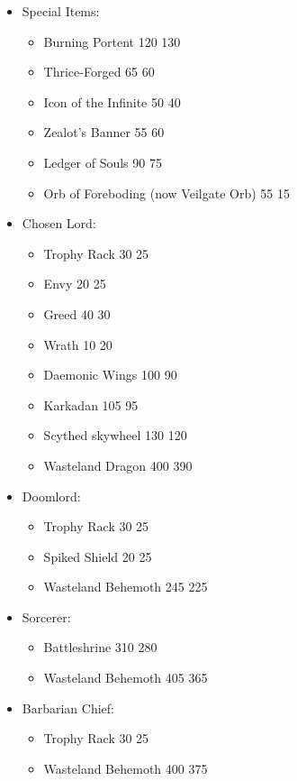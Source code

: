 \subtitle{Balance update}

\begin{itemize}
\item Special Items:
\begin{itemize}
\item Burning Portent 120 \costup{} 130
\item Thrice-Forged 65 \costdown{} 60
\item Icon of the Infinite 50 \costdown{} 40
\item Zealot's Banner 55 \costup{} 60
\item Ledger of Souls 90 \costdown{} 75
\item Orb of Foreboding (now Veilgate Orb) 55 \costdown{} 15
\end{itemize}
\item Chosen Lord:
\begin{itemize} 
\item Trophy Rack 30 \costdown{} 25
\item Envy 20 \costup{} 25
\item Greed 40 \costdown{} 30
\item Wrath 10 \costup{} 20
\item Daemonic Wings 100 \costdown{} 90
\item Karkadan 105 \costdown{} 95
\item Scythed skywheel 130 \costdown{} 120
\item Wasteland Dragon 400 \costdown{} 390
\end{itemize}
\item Doomlord:
\begin{itemize}
\item Trophy Rack 30 \costdown{} 25
\item Spiked Shield 20 \costup{} 25
\item Wasteland Behemoth 245 \costdown{} 225
\end{itemize}
\item Sorcerer:
\begin{itemize}
\item Battleshrine 310 \costdown{} 280
\item Wasteland Behemoth 405 \costdown{} 365
\end{itemize}
\item Barbarian Chief:
\begin{itemize}
\item Trophy Rack 30 \costdown{} 25
\item Wasteland Behemoth 400 \costdown{} 375
\end{itemize}

\end{itemize}
